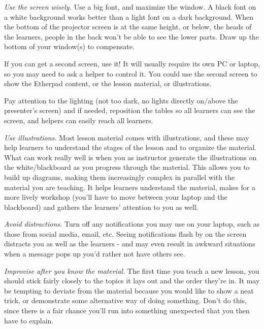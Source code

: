 \begin{genumerate}
\item
  \emph{Use the screen wisely.}  Use a big font, and maximize the
  window. A black font on a white background works better than a light
  font on a dark background. When the bottom of the projector screen
  is at the same height, or below, the heads of the learners, people
  in the back won't be able to see the lower parts. Draw up the bottom
  of your window(s) to compensate.

  If you can get a second screen, use it! It will usually require its
  own PC or laptop, so you may need to ask a helper to control it. You
  could use the second screen to show the Etherpad content, or the
  lesson material, or illustrations.

  Pay attention to the lighting (not too dark, no lights directly
  on/above the presenter's screen) and if needed, reposition the
  tables so all learners can see the screen, and helpers can easily
  reach all learners.

\item
  \emph{Use illustrations.}  Most lesson material comes with
  illustrations, and these may help learners to understand the stages
  of the lesson and to organize the material. What can work really
  well is when you as instructor generate the illustrations on the
  white/blackboard as you progress through the material. This allows
  you to build up diagrams, making them increasingly complex in
  parallel with the material you are teaching. It helps learners
  understand the material, makes for a more lively workshop (you'll
  have to move between your laptop and the blackboard) and gathers the
  learners' attention to you as well.

\item
  \emph{Avoid distractions.}  Turn off any notifications you may use
  on your laptop, such as those from social media, email, etc. Seeing
  notifications flash by on the screen distracts you as well as the
  learners - and may even result in awkward situations when a message
  pops up you'd rather not have others see.

\item
  \emph{Improvise after you know the material.}  The first time you
  teach a new lesson, you should stick fairly closely to the topics it
  lays out and the order they're in.  It may be tempting to deviate
  from the material because you would like to show a neat trick, or
  demonstrate some alternative way of doing something. Don't do this,
  since there is a fair chance you'll run into something unexpected
  that you then have to explain.


\end{genumerate}
